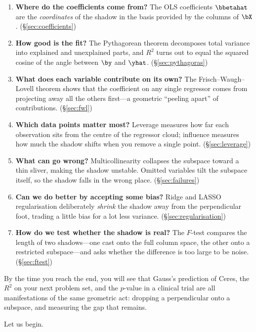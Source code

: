 \begin{enumerate}[leftmargin=2em]
  \item \textbf{Where do the coefficients come from?}
    The OLS coefficients $\bbetahat$ are the \emph{coordinates} of the
    shadow in the basis provided by the columns of $\bX$.
    (\S\ref{sec:coefficients})

  \item \textbf{How good is the fit?}
    The Pythagorean theorem decomposes total variance into explained
    and unexplained parts, and $R^2$ turns out to equal the squared
    cosine of the angle between $\by$ and $\yhat$.
    (\S\ref{sec:pythagoras})

  \item \textbf{What does each variable contribute on its own?}
    The Frisch--Waugh--Lovell theorem shows that the coefficient on any
    single regressor comes from projecting away all the others
    first---a geometric ``peeling apart'' of contributions.
    (\S\ref{sec:fwl})

  \item \textbf{Which data points matter most?}
    Leverage measures how far each observation sits from the centre of
    the regressor cloud; influence measures how much the shadow shifts
    when you remove a single point.
    (\S\ref{sec:leverage})

  \item \textbf{What can go wrong?}
    Multicollinearity collapses the subspace toward a thin sliver,
    making the shadow unstable.  Omitted variables tilt the subspace
    itself, so the shadow falls in the wrong place.
    (\S\ref{sec:failures})

  \item \textbf{Can we do better by accepting some bias?}
    Ridge and LASSO regularisation deliberately \emph{shrink} the
    shadow away from the perpendicular foot, trading a little bias for
    a lot less variance.
    (\S\ref{sec:regularisation})

  \item \textbf{How do we test whether the shadow is real?}
    The $F$-test compares the length of two shadows---one cast onto the
    full column space, the other onto a restricted subspace---and asks
    whether the difference is too large to be noise.
    (\S\ref{sec:ftest})
\end{enumerate}

\noindent
By the time you reach the end, you will see that Gauss's prediction of
Ceres, the $R^2$ on your next problem set, and the $p$-value in a
clinical trial are all manifestations of the same geometric act:
dropping a perpendicular onto a subspace, and measuring the gap that
remains.

Let us begin.
